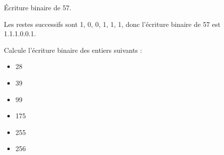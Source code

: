 \documentclass[class=report,crop=false, 12pt]{standalone}
\begin{document}
\begin{exemple}
Écriture binaire de 57.


Les restes successifs sont 1, 0, 0, 1, 1, 1, donc l'écriture binaire de 57 est 1.1.1.0.0.1.
\end{exemple}

\bigskip

\begin{activite}
Calcule l'écriture binaire des entiers suivants :
\begin{itemize}
  \item 28
  \item 39
  \item 99
  \item 175
  \item 255
  \item 256  
\end{itemize}  
 
\end{activite}
\end{document}

